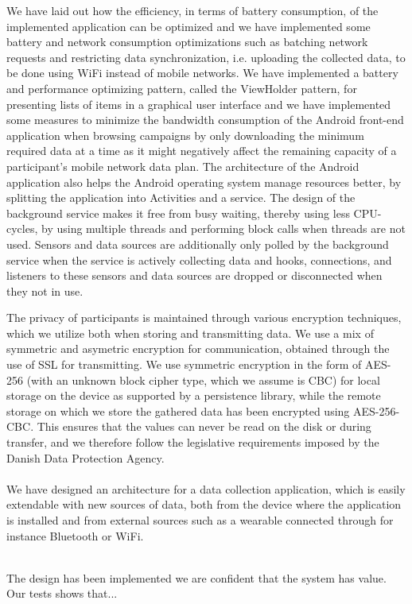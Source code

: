 We have laid out how the efficiency, in terms of battery consumption, of the implemented application can be optimized and we have implemented some battery and network consumption optimizations such as batching network requests and restricting data synchronization, i.e. uploading the collected data, to be done using WiFi instead of mobile networks. We have implemented a battery and performance optimizing pattern, called the ViewHolder pattern, for presenting lists of items in a graphical user interface and we have implemented some measures to minimize the bandwidth consumption of the Android front-end application when browsing campaigns by only downloading the minimum required data at a time as it might negatively affect the remaining capacity of a participant's mobile network data plan. The architecture of the Android application also helps the Android operating system manage resources better, by splitting the application into Activities and a service. The design of the background service makes it free from busy waiting, thereby using less CPU-cycles, by using multiple threads and performing block calls when threads are not used. Sensors and data sources are additionally only polled by the background service when the service is actively collecting data and hooks, connections, and listeners to these sensors and data sources are dropped or disconnected when they not in use. 


The privacy of participants is maintained through various encryption techniques, which we utilize both when storing and transmitting data. We use a mix of symmetric and asymetric encryption for communication, obtained through the use of SSL for transmitting. We use symmetric encryption in the form of AES-256 (with an unknown block cipher type, which we assume is CBC) for local storage on the device as supported by a persistence library, while the remote storage on which we store the gathered data has been encrypted using AES-256-CBC. This ensures that the values can never be read on the disk or during transfer, and we therefore follow the legislative requirements imposed by the Danish Data Protection Agency. 
\\\\
We have designed an architecture for a data collection application, which is easily extendable with new sources of data, both from the device where the application is installed and from external sources such as a wearable connected through for instance Bluetooth or WiFi.
\\\\



The design has been implemented we are confident that the system has value. Our tests shows that... 



